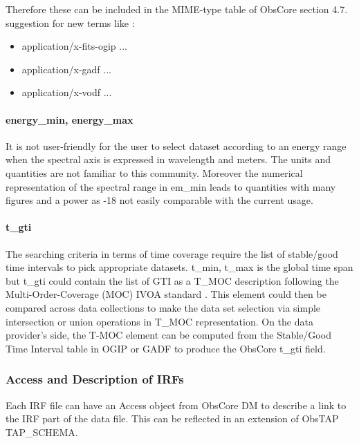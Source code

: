 \documentclass[11pt,a4paper]{ivoa}
\begin{document}
Therefore these can be included in the MIME-type table of ObsCore section 4.7. suggestion for new terms like :
\begin{itemize}
\item application/x-fits-ogip ...
\item application/x-gadf  ...
\item application/x-vodf  ...
\end{itemize}

\paragraph{energy\_min, energy\_max}
It is not user-friendly for the user to select dataset according to an energy range when the spectral axis is expressed in wavelength and meters. The units and quantities are not familiar to this community.
Moreover the numerical representation of the spectral range in em\_min leads to quantities with many figures and a power as -18 not easily comparable with the current usage.



\paragraph{t\_gti}

The searching criteria in terms of time coverage require the list of stable/good time intervals to pick appropriate datasets.
t\_min, t\_max is the global time span but t\_gti could contain the list of GTI as a T\_MOC description following the Multi-Order-Coverage (MOC) IVOA standard \citep{2022ivoa.spec.0727F}.
This element could then be compared across data collections to make the data set selection via simple intersection or union operations in T\_MOC representation.
On the data provider's side, the T-MOC element can be computed from the Stable/Good Time Interval table in OGIP or GADF to produce the ObsCore t\_gti field.




\subsubsection{Access and Description of IRFs}

Each IRF file can have an Access object from ObsCore DM to describe a link to the IRF part of the data file.
This can be reflected in an extension of ObsTAP TAP\_SCHEMA.
\end{document}
